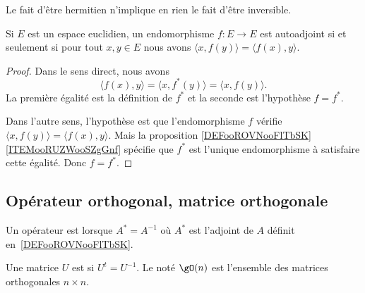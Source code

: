 \begin{remark}
	Le fait d'être hermitien n'implique en rien le fait d'être inversible.
\end{remark}

\begin{lemma}
	Si \( E\) est un espace euclidien, un endomorphisme \( f\colon E\to E\) est autoadjoint si et seulement si pour tout \( x,y\in E\) nous avons \( \langle x, f(y)\rangle=\langle f(x), y\rangle  \).
\end{lemma}

\begin{proof}
	Dans le sens direct, nous avons
	\begin{equation}
		\langle f(x), y\rangle =\langle x, f^*(y)\rangle =\langle x, f(y)\rangle .
	\end{equation}
	La première égalité est la définition de \( f^*\) et la seconde est l'hypothèse \( f=f^*\).

	Dans l'autre sens, l'hypothèse est que l'endomorphisme \( f\) vérifie \( \langle x, f(y)\rangle =\langle f(x), y\rangle \). Mais la proposition \ref{DEFooROVNooFlTbSK}\ref{ITEMooRUZWooSZgGnf} spécifie que \( f^*\) est l'unique endomorphisme à satisfaire cette égalité. Donc \( f=f^*\).
\end{proof}

\subsection{Opérateur orthogonal, matrice orthogonale}

\begin{definition}      \label{DEFooYKCSooURQDoS}
	Un opérateur est  lorsque \( A^*=A^{-1}\) où \( A^*\) est l'adjoint de \( A\) définit en~\ref{DEFooROVNooFlTbSK}.
\end{definition}

\begin{definition}      \label{DEFooUHANooLVBVID}
	Une matrice \( U\) est  si \( U^t=U^{-1}\). Le  noté \( \gO(n)\) est l'ensemble des matrices orthogonales \( n\times n\).
\end{definition}

